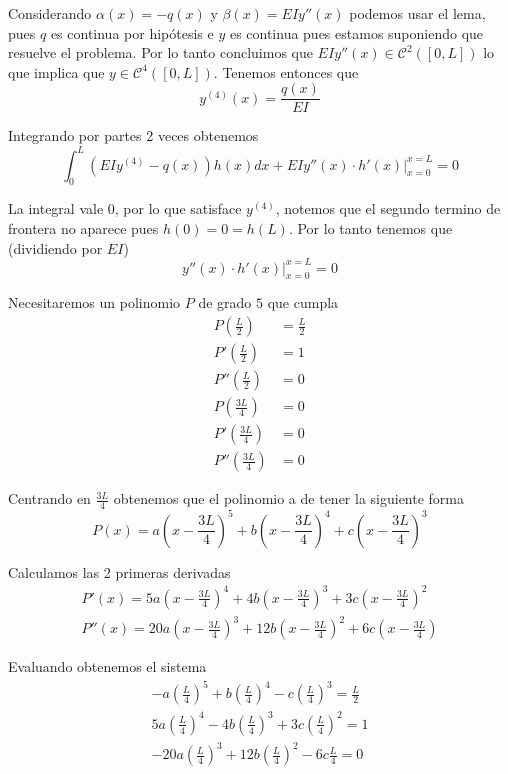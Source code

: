 \documentclass[a4paper,oneside,10.5pt]{USMArt}
\begin{document}
\begin{sol}
  Considerando $\alpha(x) = -q(x)$ y $\beta(x) = EIy''(x)$ podemos usar el lema,
  pues $q$ es continua por hipótesis e $y$ es continua pues estamos suponiendo que resuelve el problema. Por lo tanto
  concluimos que $EIy''(x) \in \mathcal{C}^{2}([0, L])$ lo que implica que $y \in \mathcal{C}^{4}([0, L])$. Tenemos
  entonces que
  \begin{equation*}
    y^{(4)}(x) = \frac{q(x)}{EI}
  \end{equation*}

  Integrando por partes 2 veces obtenemos
  \begin{equation*}
    \int_{0}^{L} (EIy^{(4)} - q(x))h(x) dx + EIy''(x) \cdot h'(x)|_{x = 0}^{x = L} = 0
  \end{equation*}

  La integral vale $0$, por lo que satisface $y^{(4)}$, notemos que el segundo termino
  de frontera no aparece pues $h(0) = 0 = h(L)$. Por lo tanto tenemos que (dividiendo por $EI$)
  \begin{equation*}
    y''(x) \cdot h'(x)|_{x = 0}^{x = L} = 0
  \end{equation*}

  Necesitaremos un polinomio $P$ de grado $5$ que cumpla
  \begin{align*}
    P(\frac{L}{2}) &= \frac{L}{2}\\
    P'(\frac{L}{2}) &= 1\\
    P''(\frac{L}{2}) &= 0\\
    P(\frac{3L}{4}) &= 0\\
    P'(\frac{3L}{4}) &= 0\\
    P''(\frac{3L}{4}) &= 0
  \end{align*}

  Centrando en $\frac{3L}{4}$ obtenemos que el polinomio a de tener la siguiente forma
  \begin{equation*}
    P(x) = a(x - \frac{3L}{4})^{5} + b(x - \frac{3L}{4})^{4} + c(x - \frac{3L}{4})^{3}
  \end{equation*}

  Calculamos las 2 primeras derivadas
  \begin{gather*}
    P'(x) = 5a(x - \frac{3L}{4})^{4} + 4b(x - \frac{3L}{4})^{3} + 3c(x - \frac{3L}{4})^{2}\\
    P''(x) = 20a(x - \frac{3L}{4})^{3} + 12b(x - \frac{3L}{4})^{2} + 6c(x - \frac{3L}{4})
  \end{gather*}

  Evaluando obtenemos el sistema
  \begin{gather*}
    -a(\frac{L}{4})^{5} + b (\frac{L}{4})^{4} - c(\frac{L}{4})^{3} = \frac{L}{2}\\
    5a (\frac{L}{4})^{4} - 4b (\frac{L}{4})^{3} + 3c (\frac{L}{4})^{2} = 1\\
    -20a (\frac{L}{4})^{3} + 12b (\frac{L}{4})^{2} - 6c \frac{L}{4} = 0
  \end{gather*}


\end{sol}
\end{document}
